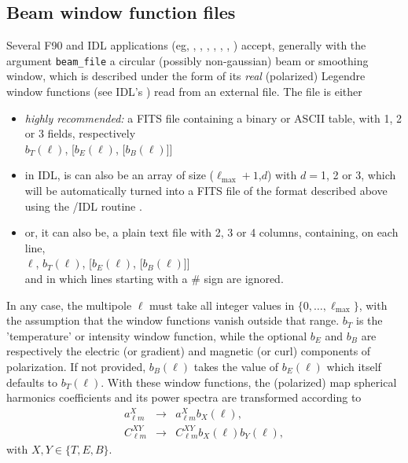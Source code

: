\documentclass[12pt,twoside]{article}
\newcommand{\lmax}{\ell_{\mathrm{max}}}
\begin{document}
\subsection{Beam window function files}
\label{fac:subsec:beamfiles}
Several F90 and IDL applications (eg,
, 
, 
, 
, 
, 
, 
)
accept, generally with the argument {\tt beam\_file} a circular (possibly non-gaussian) beam or smoothing window,
which is described under the form of its {\em real} (polarized) Legendre window functions
(see IDL's )
read from an external file.\label{page:beamfiles}
The file is either 
\begin{itemize}
\item 
{\em highly recommended:} a FITS file containing a binary or ASCII table, with 1, 2 or 3 fields, respectively\\
$b_T(\ell)$, [$b_E(\ell)$, [$b_B(\ell)$]]
\item 
 in IDL, is can also be an array of size ($\lmax+1$,$d$) with $d=$1, 2 or 3, which will be 
automatically turned into a FITS file of the format described above using the 
\healpixns/IDL routine .
\item 
or, it can also be, a plain text file with 2, 3 or 4 columns, containing, on each line,  \\
$\ell$, $b_T(\ell)$, [$b_E(\ell)$, [$b_B(\ell)$]]\\ 
and in which lines starting with a \# sign are ignored.
\end{itemize}
In any case, 
the multipole $\ell$ must take all integer values in $\{0,\ldots,\lmax\}$, 
with the assumption that the window functions vanish outside that range.
$b_T$ is the 'temperature' or intensity window function, 
while the optional $b_E$ and $b_B$ are respectively the electric (or gradient) and
magnetic (or curl) components of polarization.
If not provided, $b_B(\ell)$ takes the value of $b_E(\ell)$ which itself defaults to $b_T(\ell)$.
With these window functions, the (polarized) 
map spherical harmonics coefficients and its power spectra are transformed according to
\begin{eqnarray}
	a^{X}_{\ell m} &\longrightarrow& a^{X}_{\ell m} b_{X}(\ell),\\
	C^{XY}_{\ell m} &\longrightarrow& C^{XY}_{\ell m} b_{X}(\ell)b_{Y}(\ell),
\end{eqnarray}
with $X,Y \in \{T,E,B\}$.
\end{document}
